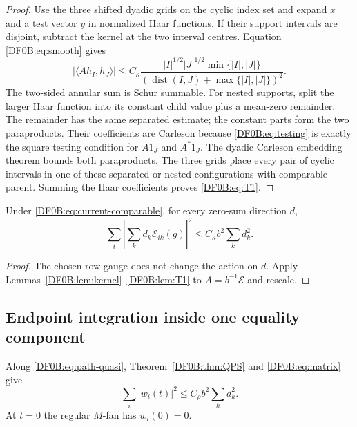 \begin{proof}
Use the three shifted dyadic grids on the cyclic index set and expand
$x$ and a test vector $y$ in normalized Haar functions.  If their
support intervals are disjoint, subtract the kernel at the two interval
centres.  Equation \eqref{DF0B:eq:smooth} gives
\[
 |\langle Ah_I,h_J\rangle|
 \le C_\kappa
 \frac{|I|^{1/2}|J|^{1/2}\min\{|I|,|J|\}}
 {(\operatorname {dist}(I,J)+\max\{|I|,|J|\})^2}.
\]
The two-sided annular sum is Schur summable.  For nested supports, split
the larger Haar function into its constant child value plus a mean-zero
remainder.  The remainder has the same separated estimate; the constant
parts form the two paraproducts.  Their coefficients are Carleson because
\eqref{DF0B:eq:testing} is exactly the square testing condition for $A1_J$
and $A^*1_J$.  The dyadic Carleson embedding theorem bounds both
paraproducts.  The three grids place every pair of cyclic intervals in
one of these separated or nested configurations with comparable parent.
Summing the Haar coefficients proves \eqref{DF0B:eq:T1}.
\end{proof}

\begin{theorem}
\label{DF0B:thm:QPS}
Under \eqref{DF0B:eq:current-comparable}, for every zero-sum direction $d$,
\begin{equation}\label{DF0B:eq:QPS}
 \boxed{
 \sum_i\left|\sum_kd_k\mathcal E_{ik}(g)\right|^2
 \le C_\kappa b^2\sum_kd_k^2.}
\end{equation}
\end{theorem}

\begin{proof}
The chosen row gauge does not change the action on $d$.  Apply
Lemmas~\ref{DF0B:lem:kernel}--\ref{DF0B:lem:T1} to
$A=b^{-1}\widetilde{\mathcal E}$ and rescale.
\end{proof}

\subsection{Endpoint integration inside one equality component}

Along \eqref{DF0B:eq:path-quasi}, Theorem~\ref{DF0B:thm:QPS} and
\eqref{DF0B:eq:matrix} give
\begin{equation}\label{DF0B:eq:material-L2}
 \sum_i|\dot w_i(t)|^2\le C_\rho b^2\sum_kd_k^2.
\end{equation}
At $t=0$ the regular $M$-fan has $w_i(0)=0$.

